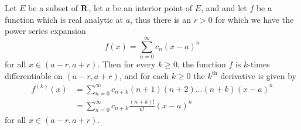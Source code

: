 \setcounter{theorem}{5}
\begin{proposition}\label{4.2.6}
  Let \(E\) be a subset of \(\mathbf{R}\), let \(a\) be an interior point of \(E\), and and let \(f\) be a function which is real analytic at \(a\), thus there is an \(r > 0\) for which we have the power series expansion
  \[
    f(x) = \sum_{n = 0}^\infty c_n (x - a)^n
  \]
  for all \(x \in (a - r, a + r)\).
  Then for every \(k \geq 0\), the function \(f\) is \(k\)-times differentiable on \((a - r, a + r)\), and for each \(k \geq 0\) the \(k^{\text{th}}\) derivative is given by
  \begin{align*}
    f^{(k)}(x) & = \sum_{n = 0}^\infty c_{n + k} (n + 1) (n + 2) \dots (n + k) (x - a)^n \\
               & = \sum_{n = 0}^\infty c_{n + k} \frac{(n + k)!}{n!} (x - a)^n
  \end{align*}
  for all \(x \in (a - r, a + r)\).
\end{proposition}

